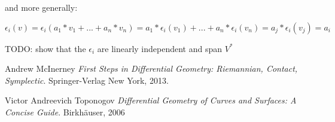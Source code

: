 \documentclass{article}
\begin{document}
and more generally:

\begin{equation*}
  \epsilon_{i}(v) = \epsilon_{i}(a_{1} * v_{1} + ... + a_{n} * v_{n}) = a_{1} * \epsilon_{i}(v_{1}) + ... + a_{n} * \epsilon_{i}(v_{n}) = a_{j} * \epsilon_{i}(v_{j}) = a_{i}
\end{equation*}

TODO: show that the $\epsilon_{i}$ are linearly independent and span $V^{*}$

\begin{thebibliography}{9}

{}
  
Andrew McInerney
\textit{First Steps in Differential Geometry: Riemannian, Contact, Symplectic}. 
Springer-Verlag New York, 2013.

Victor Andreevich Toponogov
\textit{Differential Geometry of Curves and Surfaces: A Concise Guide}. 
Birkhäuser, 2006
\end{thebibliography}
\end{document}
